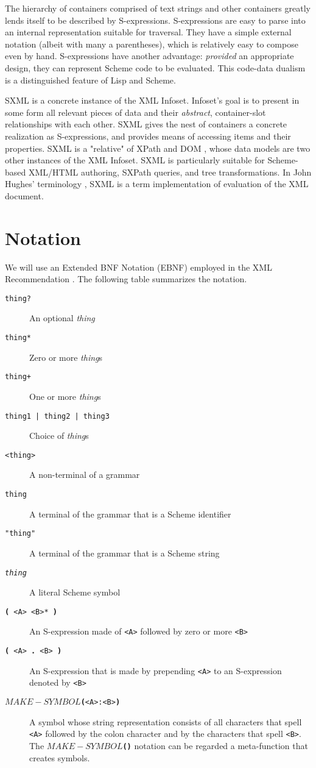 \documentclass[10pt]{article}
\begin{document}
The hierarchy of containers comprised of text strings and other
containers greatly lends itself to be described by
S-expressions. S-expressions \cite{McCarthy} are easy to parse into an internal
representation suitable for traversal.  They have a simple external
notation (albeit with many a parentheses), which is relatively easy to
compose even by hand.  S-expressions have another advantage: \emph{provided} an appropriate design, they can represent Scheme code to be evaluated.
 This code-data dualism is a distinguished feature of Lisp and Scheme. 

SXML is a concrete instance of the XML Infoset. Infoset's goal is
to present in some form all relevant pieces of data and their \emph{abstract}, container-slot relationships with each other.  SXML
gives the nest of containers a concrete realization as S-expressions,
and provides means of accessing items and their properties. SXML is a
"relative" of XPath \cite{XPath} and DOM \cite{DOM},
whose data models are two other instances of the XML Infoset. SXML is
particularly suitable for Scheme-based XML/HTML authoring, SXPath
queries, and tree transformations. In John Hughes' terminology \cite{Hughes-PP}, SXML is a term implementation of evaluation of the XML
document.

\section{Notation}
We will use an Extended BNF Notation (EBNF) employed in the XML
Recommendation \cite{XML}. The following table summarizes the notation.

\begin{description}
\item [\texttt{thing?}] An optional \emph{thing}
\item [\texttt{thing*}] Zero or more \emph{thing}s
\item [\texttt{thing+}] One or more \emph{thing}s
\item [\texttt{thing1 | thing2 | thing3}] Choice of \emph{thing}s
\item [\texttt{<thing>}] A non-terminal of a grammar
\item [\texttt{thing}] A terminal of the grammar that is a Scheme identifier
\item [\texttt{"thing"}] A terminal of the grammar that is a Scheme string
\item [\texttt{{\itshape thing}}] A literal Scheme symbol
\item [\texttt{\textbf{(} <A> <B>* \textbf{)}}] An S-expression made of \texttt{<A>} followed by zero or more \texttt{<B>}
\item [\texttt{\textbf{(} <A>\textbf{ . }<B> \textbf{)}}] An S-expression that is made by prepending \texttt{<A>} to an S-expression denoted by \texttt{<B>}
\item [\texttt{\textbf{$MAKE-SYMBOL$(}<A>:<B>\textbf{)}}] A symbol whose string representation consists of all
characters that spell \texttt{<A>} followed by the colon character and by the characters that spell \texttt{<B>}. The \texttt{\textbf{$MAKE-SYMBOL$(}\textbf{)}} notation can be regarded a meta-function that creates symbols.
\end{description}
\end{document}
